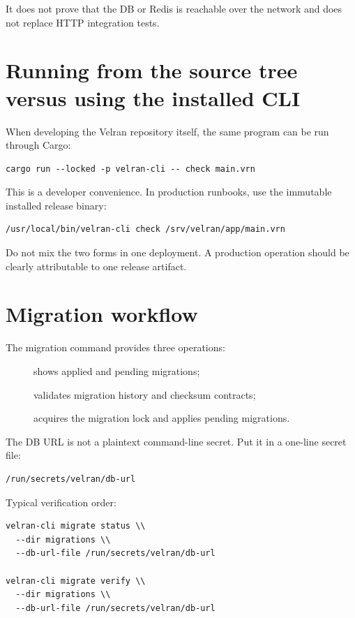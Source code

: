 It does not prove that the DB or Redis is reachable over the network and does not replace HTTP integration tests.

\section{Running from the source tree versus using the installed CLI}

When developing the Velran repository itself, the same program can be run through Cargo:

\begin{lstlisting}
cargo run --locked -p velran-cli -- check main.vrn
\end{lstlisting}

This is a developer convenience. In production runbooks, use the immutable installed release binary:

\begin{lstlisting}
/usr/local/bin/velran-cli check /srv/velran/app/main.vrn
\end{lstlisting}

Do not mix the two forms in one deployment. A production operation should be clearly attributable to one release artifact.

\section{Migration workflow}

The migration command provides three operations:

\begin{description}
  \item[] shows applied and pending migrations;
  \item[] validates migration history and checksum contracts;
  \item[] acquires the migration lock and applies pending migrations.
\end{description}

The DB URL is not a plaintext command-line secret. Put it in a one-line secret file:

\begin{lstlisting}
/run/secrets/velran/db-url
\end{lstlisting}

Typical verification order:

\begin{lstlisting}
velran-cli migrate status \\
  --dir migrations \\
  --db-url-file /run/secrets/velran/db-url

velran-cli migrate verify \\
  --dir migrations \\
  --db-url-file /run/secrets/velran/db-url
\end{lstlisting}

